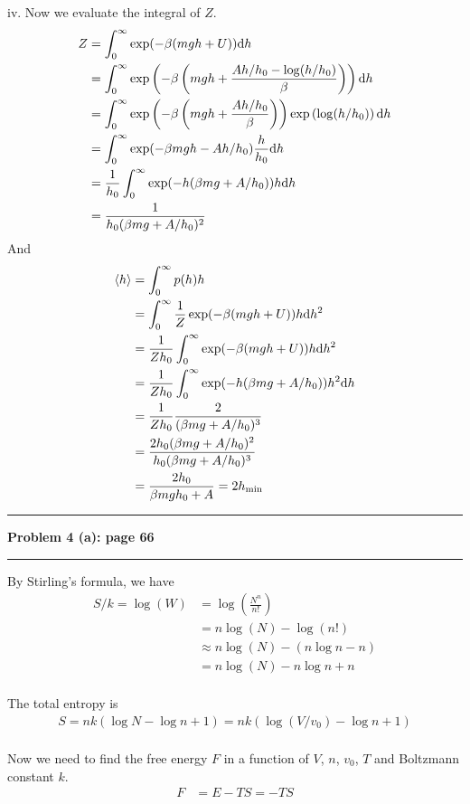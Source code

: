 \documentclass[11pt]{article}
\newcommand\question[2]{\vspace{.25in}\hrule\textbf{#1: #2}\vspace{.5em}\hrule\vspace{.10in}}
\begin{document}
iv.
Now we evaluate the integral of $Z$.
\begin{align*}
    Z &= \int_{0}^{\infty} \exp(-\beta(mgh+U))\mathrm{d} h\\
      &= \int_{0}^{\infty} \exp\left(-\beta\left(mgh+\frac{Ah/h_0 - \log(h/h_0)}{\beta}\right)\right)\mathrm{d} h\\
      &= \int_{0}^{\infty} \exp\left(-\beta\left(mgh+\frac{Ah/h_0}{\beta}\right)\right)\exp\left(\log(h/h_0)\right)\mathrm{d} h\\
      &= \int_{0}^{\infty} \exp(-\beta mgh - Ah/h_0)\frac{h}{h_0}\mathrm{d} h\\
      &= \frac{1}{h_0}\int_{0}^{\infty} \exp(-h(\beta mg + A/h_0))h\mathrm{d} h\\
      &= \frac{1}{h_0(\beta mg + A/h_0)^2}
\end{align*}
And
\begin{align*}
    \langle h \rangle 
    &= \int_{0}^{\infty} p(h)h \\
    &= \int_{0}^{\infty} \frac{1}{Z}\exp(-\beta(mgh+U))h\mathrm{d} h^2\\
    &= \frac{1}{Zh_0}\int_{0}^{\infty} \exp(-\beta(mgh+U))h\mathrm{d} h^2\\
    &= \frac{1}{Zh_0}\int_{0}^{\infty} \exp(-h(\beta mg + A/h_0))h^2\mathrm{d} h\\
    &= \frac{1}{Zh_0} \frac{2}{(\beta mg + A/h_0)^3}\\
    &= \frac{2h_0(\beta mg + A/h_0)^2}{h_0(\beta mg + A/h_0)^3}\\
    &= \frac{2h_0}{\beta mgh_0 + A} = 2h_\mathrm{min}
\end{align*}

\question{Problem 4 (a)}{page 66}
By Stirling's formula, we have
\begin{align*}
    S/k = \log(W) &= \log\left(\frac{N^n}{n!}\right) \\
                  &= n\log(N) - \log(n!) \\
                  &\approx n\log(N) - (n\log n - n) \\
                  &= n\log(N) - n\log n + n \\
\end{align*}

The total entropy is 
\begin{align*}
    S = nk(\log N - \log n + 1) = nk(\log (V/v_0) - \log n +1)\\
\end{align*}

Now we need to find the free energy $F$ in a function of $V$, $n$, $v_0$, $T$ and Boltzmann constant $k$.
\begin{align*}
    F &= E - TS = -TS
\end{align*}
\end{document}
